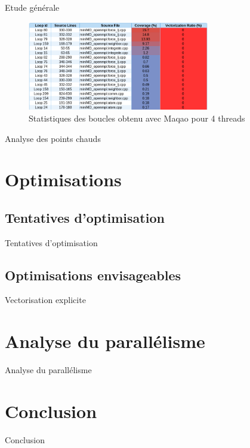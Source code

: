 \documentclass[9.5pt]{beamer}
\begin{document}
		\begin{frame}{Etude générale}
			
			\begin{figure}[h!]
				\centering
				\begin{center}
					\includegraphics[width=300px]{images/maqao_loops.png}
					\caption{Statistiques des boucles obtenu avec Maqao pour 4 threads}
					\label{loop_maqao}
				\end{center}
			\end{figure}
		\end{frame}

		\begin{frame}{Analyse des points chauds}
			
		\end{frame}

\section{Optimisations}
	\subsection{Tentatives d'optimisation}
		\begin{frame}{Tentatives d'optimisation}
		\end{frame}

	\subsection{Optimisations envisageables}
		\begin{frame}{Vectorisation explicite}
		\end{frame}

\section{Analyse du parallélisme}
	\begin{frame}{Analyse du parallélisme}
	\end{frame}

\section{Conclusion}
	\begin{frame}{Conclusion}
	\end{frame}
\end{document}
